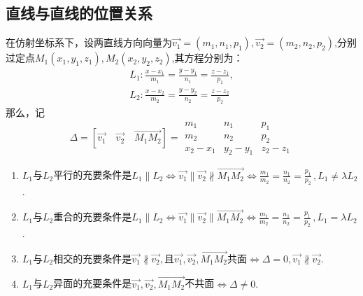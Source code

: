\subsection{直线与直线的位置关系}
\ttheorem[直线与直线的位置关系]
\quad 在仿射坐标系下，设两直线方向向量为$\overrightarrow{v_1}=(m_1,n_1,p_1),\overrightarrow{v_2}=(m_2,n_2,p_2)$,分别过定点$M_1(x_1,y_1,z_1),M_2(x_2,y_2,z_2)$,其方程分别为：
\begin{equation*}
\begin{array}{c}
\displaystyle L_1:\frac{x-x_1}{m_1}=\frac{y-y_1}{n_1}=\frac{z-z_1}{p_1},\\
\displaystyle L_2:\frac{x-x_2}{m_2}=\frac{y-y_2}{n_2}=\frac{z-z_2}{p_2}
\end{array}
\end{equation*}
那么，记
\begin{equation*}
\Delta =\left[ \overrightarrow{v_1} \quad \overrightarrow{v_2} \quad \overrightarrow{M_1M_2}\right] =
\begin{array}{|ccc|}
m_1 & n_1 & p_1 \\ 
m_2 & n_2 & p_2 \\ 
x_2-x_1 & y_2-y_1 & z_2-z_1
\end{array} 
\end{equation*}
\begin{enumerate}[$\mathrm (1)$]
	\setlength{\itemindent}{3em}
	\setlength{\topsep}{0.01em}
	\setlength{\itemsep}{0.01em}
	\item  $L _1$与$L_2$平行的充要条件是$L_1 \parallel L_2 \Leftrightarrow \overrightarrow{v_1} \parallel \overrightarrow{v_2} \nparallel \overrightarrow{M_1M_2} \Leftrightarrow \displaystyle \frac{m_1}{m_2}=\frac{n_1}{n_2}=\frac{p_1}{p_2} \,,L_1 \ne \lambda L_2$.
	\item  $L _1$与$L_2$重合的充要条件是$L_1 \parallel L_2 \Leftrightarrow \overrightarrow{v_1} \parallel \overrightarrow{v_2} \parallel \overrightarrow{M_1M_2} \Leftrightarrow \displaystyle \frac{m_1}{m_2}=\frac{n_1}{n_2}=\frac{p_1}{p_2} \,,L_1 =\lambda L_2$.
	\item  $L _1$与$L_2$相交的充要条件是$\overrightarrow{v_1} \nparallel \overrightarrow{v_2},$且$\overrightarrow{v_1},\overrightarrow{v_2},\overrightarrow{M_1M_2}$共面$\Leftrightarrow \Delta = 0,\overrightarrow{v_1} \nparallel \overrightarrow{v_2}.$
	\item  $L _1$与$L_2$异面的充要条件是$\overrightarrow{v_1},\overrightarrow{v_2},\overrightarrow{M_1M_2}$不共面$\Leftrightarrow \Delta \ne  0.$
\end{enumerate}



